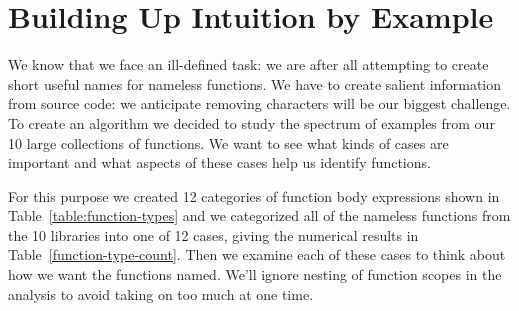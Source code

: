 \documentclass[10pt, preprint]{sigplanconf}
\begin{document}
\section{Building Up Intuition by Example}
We know that we face an ill-defined task: we are after all attempting to create short useful names for nameless functions. We have to create salient information from source code: we anticipate removing characters will be our biggest challenge.  To create an algorithm we decided to study the spectrum of examples from our 10 large collections of functions. We want to see what kinds of cases are important and what aspects of these cases help us identify functions.

For this purpose we created 12 categories of function body expressions shown in Table~\ref{table:function-types} and we categorized all of the nameless functions from the 10 libraries into one of 12 cases, giving the numerical results in Table~\ref{function-type-count}.  Then we examine each of these cases to think about how we want the functions named. We'll ignore nesting of function scopes in the analysis to avoid taking on too much at one time.
  
\end{document}
